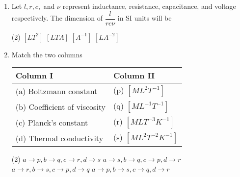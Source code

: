 \documentclass{article}
\renewcommand{\ans}{\quad}
\begin{document}
\begin{enumerate}
    \item Let $l, r, c,$ and $\nu$ represent inductance, resistance, capacitance, and voltage respectively. The dimension of $\dfrac{l}{rc\nu}$ in SI units will be
    \begin{tasks}(2)
        \task $[LT^2]$
        \task $[LTA]$
        \task $[A^{-1}]$\ans
        \task $[LA^{-2}]$
    \end{tasks}

    

    

    \item Match the two columns
    \renewcommand{\arraystretch}{1.5}
    \begin{table}[h]
        \begin{center}
        \begin{tabular}{p{5cm}|p{3cm}}
        \hline
        Column I & Column II \\
        \hline
        (a) Boltzmann constant & (p) $[ML^2T^{-1}]$ \\
        (b) Coefficient of viscosity & (q) $[ML^{-1}T^{-1}]$ \\
        (c) Planck's constant & (r) $[MLT^{-3}K^{-1}]$ \\
        (d) Thermal conductivity & (s) $[ML^2T^{-2}K^{-1}]$ \\
        \hline
        \end{tabular}
        \end{center}
        \end{table}
        \begin{tasks}(2)
            \task $a \rightarrow p, b \rightarrow q, c \rightarrow r, d \rightarrow s$
            \task $a \rightarrow s, b \rightarrow q, c \rightarrow p, d \rightarrow r$ \ans
            \task $a \rightarrow r, b \rightarrow s, c \rightarrow p, d \rightarrow q$
            \task $a \rightarrow p, b \rightarrow s, c \rightarrow q, d \rightarrow r$
        \end{tasks}


\end{enumerate}
\end{document}
